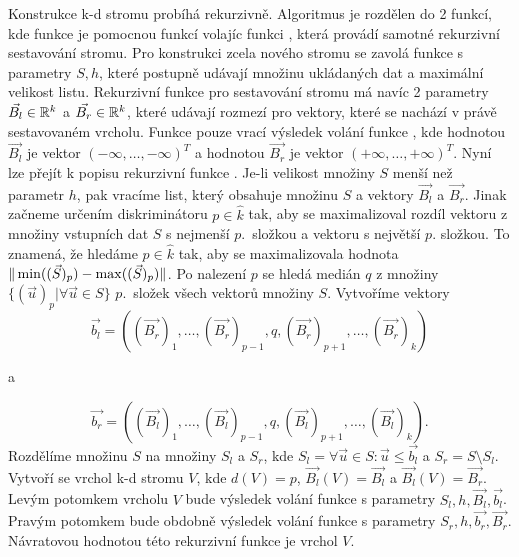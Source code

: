 Konstrukce k-d stromu probíhá rekurzivně. Algoritmus je rozdělen do 2 funkcí, kde funkce  je pomocnou funkcí volajíc funkci , která provádí samotné rekurzivní sestavování stromu. Pro konstrukci zcela nového stromu se zavolá funkce  s parametry $S, h$, které postupně udávají množinu ukládaných dat a maximální velikost listu. Rekurzivní funkce  pro sestavování stromu má navíc 2 parametry $\vec{B_l} \in \mathbb{R}^k$ a $\vec{B_r} \in \mathbb{R}^k$, které udávají rozmezí pro vektory, které se nachází v právě sestavovaném vrcholu. Funkce  pouze vrací výsledek volání funkce , kde hodnotou $\vec{B_l}$ je vektor $(-\infty, \ldots, -\infty)^T$ a hodnotou $\vec{B_r}$ je vektor $(+\infty, \ldots, +\infty)^T$. Nyní lze přejít k popisu rekurzivní funkce . Je-li velikost množiny $S$ menší než parametr $h$, pak vracíme list, který obsahuje množinu $S$ a vektory $\vec{B_l}$ a $\vec{B_r}$. Jinak začneme určením diskriminátoru $p \in \hat k$ tak, aby se maximalizoval rozdíl vektoru z množiny vstupních dat $S$ s nejmenší $p.$~složkou a vektoru s největší $p.$ složkou. To znamená, že hledáme $p \in \hat k$ tak, aby se maximalizovala hodnota $\|\min((\vec{S})_p) - \max((\vec{S})_p)\|$. Po nalezení $p$ se hledá medián $q$ z množiny $\{(\vec{u})_p | \forall \vec{u} \in S\}$ $p.$~složek všech vektorů množiny $S$. Vytvoříme vektory
\[
\vec{b_l} = ((\vec{B_r})_1, \ldots, (\vec{B_r})_{p-1}, q, (\vec{B_r})_{p+1}, \ldots, (\vec{B_r})_k)
\]
\centerline a
\[
\vec{b_r} = ((\vec{B_l})_1, \ldots, (\vec{B_l})_{p-1}, q, (\vec{B_l})_{p+1}, \ldots, (\vec{B_l})_k).
\]
Rozdělíme množinu $S$ na množiny $S_l$ a $S_r$, kde $S_l = {\forall\vec{u} \in S: \vec{u} \leq \vec{b_l}}$ a $S_r = S \setminus S_l$. Vytvoří se vrchol k-d stromu $V$, kde $d(V) = p$, $\vec{B_l}(V) = \vec{B_l}$ a $\vec{B_l}(V) = \vec{B_r}$. Levým potomkem vrcholu $V$ bude výsledek volání funkce  s parametry $S_l, h, \vec{B_l}, \vec{b_l}$. Pravým potomkem bude obdobně výsledek volání funkce  s parametry $S_r, h, \vec{b_r}, \vec{B_r}$. Návratovou hodnotou této rekurzivní funkce je vrchol $V$.

